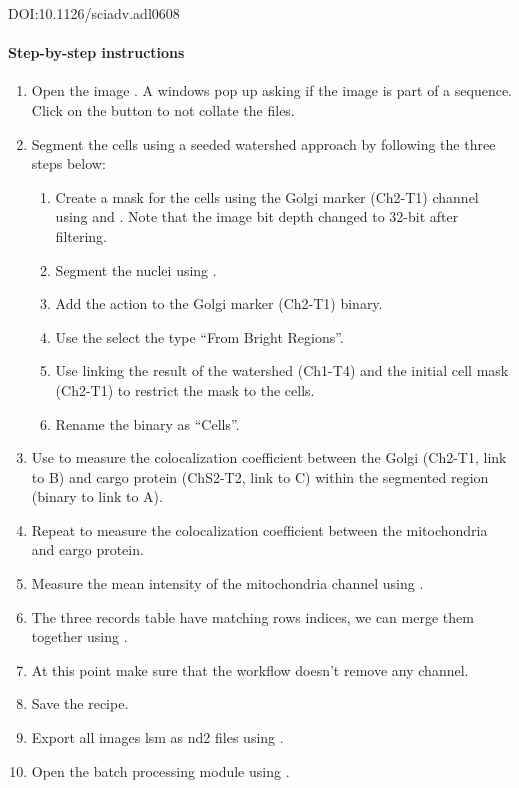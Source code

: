 DOI:10.1126/sciadv.adl0608

\paragraph{Step-by-step instructions}
\begin{enumerate}
    \item Open the image . A windows pop up asking if the image is part of a sequence. Click on the  button to not collate the files.
    \item Segment the cells using a seeded watershed approach by following the three steps below:
    \begin{enumerate}
        \item Create a mask for the cells using the Golgi marker (Ch2-T1) channel using  and 
        . 
        Note that the image bit depth changed to 32-bit after filtering.
        \item Segment the nuclei using 
        .
        \item Add the action  to the Golgi marker (Ch2-T1) binary. 
        \item Use the  select the type ``From Bright Regions''. 
        \item Use  linking the result of the watershed (Ch1-T4) and the initial cell mask (Ch2-T1) to restrict the mask to the cells.
        \item Rename the binary as ``Cells''.
    \end{enumerate}
    \item Use  to measure the colocalization coefficient between the Golgi (Ch2-T1, link to B) and cargo protein (ChS2-T2, link to C) within the segmented region (binary to link to A). 
    \item Repeat to measure the colocalization coefficient between the mitochondria and cargo protein.
    \item Measure the mean intensity of the mitochondria channel using .
    \item The three records table have matching rows indices, we can merge them together using .
    \item At this point make sure that the workflow doesn't remove any channel.
    \item Save the recipe.
    \item Export all images lsm as nd2 files using .
    \item Open the batch processing module using .
\end{enumerate}
